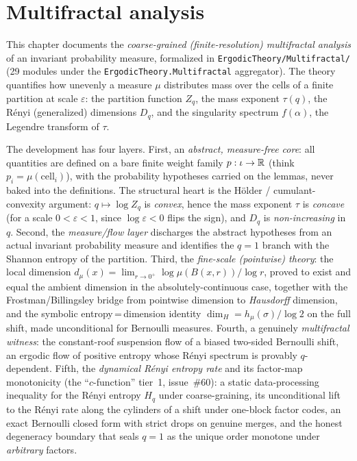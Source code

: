 \chapter{Multifractal analysis}
\label{chap:multifractal}

This chapter documents the \emph{coarse-grained (finite-resolution) multifractal analysis} of an
invariant probability measure, formalized in \texttt{ErgodicTheory/Multifractal/} (29 modules under
the \texttt{ErgodicTheory.Multifractal} aggregator). The theory quantifies how unevenly a measure
\(\mu\) distributes mass over the cells of a finite partition at scale \(\varepsilon\): the
partition function \(Z_q\), the mass exponent \(\tau(q)\), the R\'enyi (generalized) dimensions
\(D_q\), and the singularity spectrum \(f(\alpha)\), the Legendre transform of \(\tau\).

The development has four layers. First, an \emph{abstract, measure-free core}: all quantities are
defined on a bare finite weight family \(p : \iota \to \mathbb{R}\) (think \(p_i = \mu(\text{cell}_i)\)),
with the probability hypotheses carried on the lemmas, never baked into the definitions. The
structural heart is the H\"older / cumulant-convexity argument: \(q \mapsto \log Z_q\) is
\emph{convex}, hence the mass exponent \(\tau\) is \emph{concave} (for a scale
\(0 < \varepsilon < 1\), since \(\log\varepsilon < 0\) flips the sign), and \(D_q\) is
\emph{non-increasing} in \(q\). Second, the \emph{measure/flow layer} discharges the abstract
hypotheses from an actual invariant probability measure and identifies the \(q = 1\) branch with
the Shannon entropy of the partition. Third, the \emph{fine-scale (pointwise) theory}: the local
dimension \(d_\mu(x) = \lim_{r\to 0^+} \log\mu(B(x,r))/\log r\), proved to exist and equal the
ambient dimension in the absolutely-continuous case, together with the Frostman/Billingsley bridge
from pointwise dimension to \emph{Hausdorff} dimension, and the symbolic
entropy\,=\,dimension identity \(\dim_H = h_\mu(\sigma)/\log 2\) on the full shift, made
unconditional for Bernoulli measures. Fourth, a genuinely \emph{multifractal witness}: the
constant-roof suspension flow of a biased two-sided Bernoulli shift, an ergodic flow of positive
entropy whose R\'enyi spectrum is provably \(q\)-dependent. Fifth, the \emph{dynamical R\'enyi
entropy rate} and its factor-map monotonicity (the ``\(c\)-function'' tier~1, issue~\#60): a static
data-processing inequality for the R\'enyi entropy \(H_q\) under coarse-graining, its unconditional
lift to the R\'enyi rate along the cylinders of a shift under one-block factor codes, an exact
Bernoulli closed form with strict drops on genuine merges, and the honest degeneracy boundary that
seals \(q = 1\) as the unique order monotone under \emph{arbitrary} factors.

